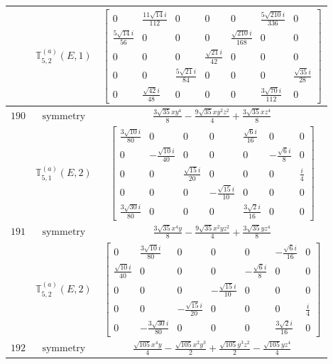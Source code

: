 \documentclass[fleqn,8pt,landscape]{jsarticle}
\begin{document}
\begin{longtable}{ccc}
$  $ & $ \mathbb{T}_{5,2}^{(a)}(E,1) $ & $ \begin{bmatrix} 0 & \frac{11 \sqrt{14} i}{112} & 0 & 0 & 0 & \frac{5 \sqrt{210} i}{336} & 0 \\ \frac{5 \sqrt{14} i}{56} & 0 & 0 & 0 & \frac{\sqrt{210} i}{168} & 0 & 0 \\ 0 & 0 & 0 & \frac{\sqrt{21} i}{42} & 0 & 0 & 0 \\ 0 & 0 & \frac{5 \sqrt{21} i}{84} & 0 & 0 & 0 & \frac{\sqrt{35} i}{28} \\ 0 & \frac{\sqrt{42} i}{48} & 0 & 0 & 0 & \frac{3 \sqrt{70} i}{112} & 0 \end{bmatrix} $ \\ \hline
$ 190 $ & $ \text{symmetry} $ & $ \frac{3 \sqrt{35} x y^{4}}{8} - \frac{9 \sqrt{35} x y^{2} z^{2}}{4} + \frac{3 \sqrt{35} x z^{4}}{8} $ \\
$  $ & $ \mathbb{T}_{5,1}^{(a)}(E,2) $ & $ \begin{bmatrix} \frac{3 \sqrt{10} i}{80} & 0 & 0 & 0 & \frac{\sqrt{6} i}{16} & 0 & 0 \\ 0 & - \frac{\sqrt{10} i}{40} & 0 & 0 & 0 & - \frac{\sqrt{6} i}{8} & 0 \\ 0 & 0 & \frac{\sqrt{15} i}{20} & 0 & 0 & 0 & \frac{i}{4} \\ 0 & 0 & 0 & - \frac{\sqrt{15} i}{10} & 0 & 0 & 0 \\ \frac{3 \sqrt{30} i}{80} & 0 & 0 & 0 & \frac{3 \sqrt{2} i}{16} & 0 & 0 \end{bmatrix} $ \\ \hline
$ 191 $ & $ \text{symmetry} $ & $ \frac{3 \sqrt{35} x^{4} y}{8} - \frac{9 \sqrt{35} x^{2} y z^{2}}{4} + \frac{3 \sqrt{35} y z^{4}}{8} $ \\
$  $ & $ \mathbb{T}_{5,2}^{(a)}(E,2) $ & $ \begin{bmatrix} 0 & \frac{3 \sqrt{10} i}{80} & 0 & 0 & 0 & - \frac{\sqrt{6} i}{16} & 0 \\ \frac{\sqrt{10} i}{40} & 0 & 0 & 0 & - \frac{\sqrt{6} i}{8} & 0 & 0 \\ 0 & 0 & 0 & - \frac{\sqrt{15} i}{10} & 0 & 0 & 0 \\ 0 & 0 & - \frac{\sqrt{15} i}{20} & 0 & 0 & 0 & \frac{i}{4} \\ 0 & - \frac{3 \sqrt{30} i}{80} & 0 & 0 & 0 & \frac{3 \sqrt{2} i}{16} & 0 \end{bmatrix} $ \\ \hline
$ 192 $ & $ \text{symmetry} $ & $ \frac{\sqrt{105} x^{4} y}{4} - \frac{\sqrt{105} x^{2} y^{3}}{2} + \frac{\sqrt{105} y^{3} z^{2}}{2} - \frac{\sqrt{105} y z^{4}}{4} $ \\

\end{longtable}
\end{document}
